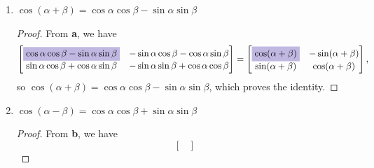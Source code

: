 \documentclass{article}
\begin{document}
\begin{enumerate}
\begin{enumerate}
\begin{proof}
\begin{align*}
\begin{bmatrix}
                    -\cos\alpha\sin\beta + \sin\alpha\cos\beta& \sin\alpha\sin\beta + \cos\alpha\cos\beta
                \end{bmatrix}.
            \end{align*} Setting this to be equal to \(X\) and rearranging some terms, \[
                \begin{bmatrix}
                    \cos\alpha\cos\beta + \sin\alpha\sin\beta&-\sin\alpha\cos\beta+\cos\alpha\sin\beta \\ 
                    \colorbox{Periwinkle!42}{\(\sin\alpha\cos\beta -\cos\alpha\sin\beta\)} & \sin\alpha\sin\beta + \cos\alpha\cos\beta
                \end{bmatrix} = \begin{bmatrix}
                    \cos(\alpha - \beta)&-\sin(\alpha - \beta) \\ \colorbox{Periwinkle!42}{\(\sin(\alpha-\beta)\)}&\cos(\alpha - \beta)
                \end{bmatrix}
            \] gives us \(\sin(\alpha - \beta) = \sin\alpha\cos\beta - \cos\alpha\sin\beta\), which proves the identity. 
        \end{proof}
        \item \(\cos(\alpha + \beta) = \cos\alpha\cos\beta - \sin\alpha\sin\beta\)\begin{proof}
            From \textbf{a}, we have\[
                \begin{bmatrix}
                    \colorbox{Periwinkle!42}{\(\cos\alpha\cos\beta - \sin\alpha\sin\beta\)}&-\sin\alpha\cos\beta-\cos\alpha\sin\beta \\ 
                    \sin\alpha\cos\beta + \cos\alpha\sin\beta& -\sin\alpha\sin\beta + \cos\alpha\cos\beta
                \end{bmatrix} = \begin{bmatrix}
                    \colorbox{Periwinkle!42}{\(\cos(\alpha + \beta)\)}&-\sin(\alpha + \beta) \\ \sin(\alpha+\beta)&\cos(\alpha + \beta)
                \end{bmatrix},
            \] so \(\cos(\alpha + \beta) = \cos\alpha\cos\beta - \sin\alpha\sin\beta\), which proves the identity. 
        \end{proof}
        \item \(\cos(\alpha - \beta) = \cos\alpha\cos\beta + \sin\alpha\sin\beta\)\begin{proof}
            From \textbf{b}, we have\[
                \begin{bmatrix}

\end{bmatrix}\]
\end{proof}
\end{enumerate}
\end{enumerate}
\end{document}
